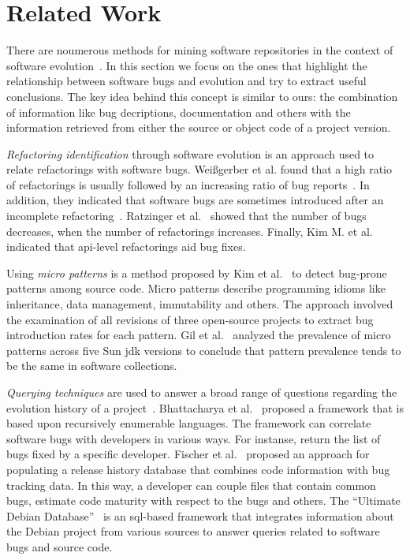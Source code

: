 \documentclass[conference]{IEEEtran}
\begin{document}
\section{Related Work}
\label{sec:rel}

There are noumerous methods for mining software repositories in the context
of software evolution~\cite{KCM07}. In this section we focus on the ones
that highlight the relationship between software bugs and evolution and try to
extract useful conclusions. The key idea behind this concept is
similar to ours: the combination of information like bug decriptions,
documentation and others with the information retrieved from either the source
or object code of a project version.

{\it Refactoring identification} through software evolution is an approach used to
relate refactorings with software bugs. Wei{\ss}gerber et al. found that a high
ratio of refactorings is usually followed by an increasing ratio of bug
reports~\cite{WD06}. In addition, they indicated that software bugs are sometimes introduced
after an incomplete refactoring~\cite{GW05}.
Ratzinger et al.~\cite{RSG08} showed that the number of bugs decreases, when the number of
refactorings increases. Finally, Kim M. et al.~\cite{KCK11} indicated that {\sc api}-level
refactorings aid bug fixes.

Using {\it micro patterns} is a method proposed by Kim et al.~\cite{KPW06}
to detect bug-prone patterns among source code. Micro patterns describe programming
idioms like inheritance, data management, immutability and others. The approach involved
the examination of all revisions of three open-source projects to extract bug
introduction rates for each pattern. Gil et al.~\cite{GM05} analyzed the
prevalence of micro patterns across five Sun {\sc jdk} versions to conclude that
pattern prevalence tends to be the same in software collections.

{\it Querying techniques} are used to answer a broad range of questions
regarding the evolution history of a project~\cite{HG05}. Bhattacharya et
al.~\cite{BN11, B11} proposed a framework that is based upon
recursively enumerable languages. The framework can correlate software
bugs with developers in various ways. For instanse, return the list of
bugs fixed by a specific developer. Fischer et al.~\cite{FPG03} proposed
an approach for populating a release history database that combines code
information with bug tracking data. In this way, a developer can couple files
that contain common bugs, estimate code maturity with respect to the bugs
and others. The ``Ultimate Debian Database''~\cite{NZ10} is an {\sc sql}-based
framework that integrates information about the Debian project from various
sources to answer queries related to software bugs and source code.
\end{document}
